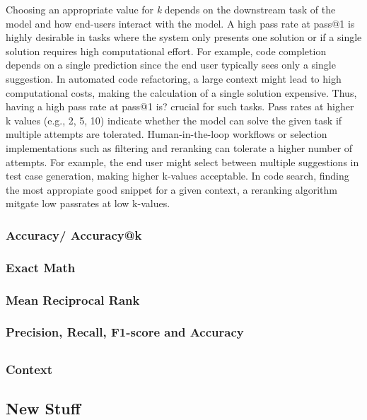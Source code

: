\documentclass[11pt]{article}
\begin{document}
Choosing an appropriate value for \emph{k} depends on the downstream task of the model and how end-users interact with the model.
A high pass rate at pass@1 is highly desirable in tasks where the system only presents one solution or if a single solution requires high computational effort.
For example, code completion depends on a single prediction since the end user typically sees only a single suggestion.
In automated code refactoring, a large context might lead to high computational costs, making the calculation of a single solution expensive.
Thus, having a high pass rate at pass@1 is? crucial for such tasks.
Pass rates at higher k values (e.g., 2, 5, 10) indicate whether the model can solve the given task if multiple attempts are tolerated.
Human-in-the-loop workflows or selection implementations such as filtering and reranking can tolerate a higher number of attempts.
For example, the end user might select between multiple suggestions in test case generation, making higher k-values acceptable.
In code search, finding the most appropiate good snippet for a given context, a reranking algorithm mitgate low passrates at low k-values.

\subsubsection{Accuracy/ Accuracy@k}
\todo{}

\subsubsection{Exact Math}
\todo{}

\subsubsection{Mean Reciprocal Rank}
\todo{}

\subsubsection{Precision, Recall, F1-score and Accuracy}
\todo{}

\subsection{}
\subsubsection{Context}
\subsection{New Stuff}
\end{document}
